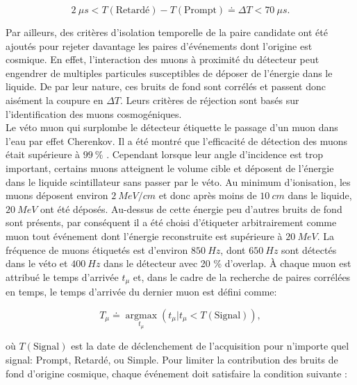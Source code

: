 \begin{equation}
\label{eq:delta_T_prompt_delayed}
    \SI{2}{\mu s} < T(\textrm{Retardé}) - T(\textrm{Prompt}) \doteq \Delta T < \SI{70}{\mu s}.
\end{equation}

\bigbreak

Par ailleurs, des critères d'isolation temporelle de la paire candidate ont été ajoutés pour rejeter davantage les paires d'événements dont l'origine est cosmique. En effet, l'interaction des muons à proximité du détecteur peut engendrer de multiples particules susceptibles de déposer de l'énergie dans le liquide. De par leur nature, ces bruits de fond sont corrélés et passent donc aisément la coupure en $\Delta T$. Leurs critères de réjection sont basés sur l'identification des muons cosmogéniques.\\

Le véto muon qui surplombe le détecteur étiquette le passage d'un muon dans l'eau par effet Cherenkov. Il a été montré que l'efficacité de détection des muons était supérieure à $\SI{99}{\%}$ \cite{docdb445}. Cependant lorsque leur angle d'incidence est trop important, certains muons atteignent le volume cible et déposent de l'énergie dans le liquide scintillateur sans passer par le véto. Au minimum d'ionisation, les muons déposent environ $\SI{2}{MeV/cm}$ et donc après moins de $\SI{10}{cm}$ dans le liquide, $\SI{20}{MeV}$ ont été déposés. Au-dessus de cette énergie peu d'autres bruits de fond sont présents, par conséquent il a été choisi d'étiqueter arbitrairement comme muon tout événement dont l'énergie reconstruite est supérieure à $\SI{20}{MeV}$. La fréquence de muons étiquetés est d'environ $\SI{850}{Hz}$, dont $\SI{650}{Hz}$ sont détectés dans le véto et $\SI{400}{Hz}$ dans le détecteur avec 20 \% d'overlap. À chaque muon est attribué le temps d'arrivée $t_\mu$ et, dans le cadre de la recherche de paires corrélées en temps, le temps d'arrivée du dernier muon est défini comme:

\begin{equation}
    T_\mu \doteq \underset{t_\mu}{\operatorname{argmax}} \left( t_\mu | t_\mu < T(\textrm{Signal})\right),
\end{equation}

\bigbreak

où $T(\textrm{Signal})$ est la date de déclenchement de l'acquisition pour n'importe quel signal: Prompt, Retardé, ou Simple. Pour limiter la contribution des bruits de fond d'origine cosmique, chaque événement doit satisfaire la condition suivante :

